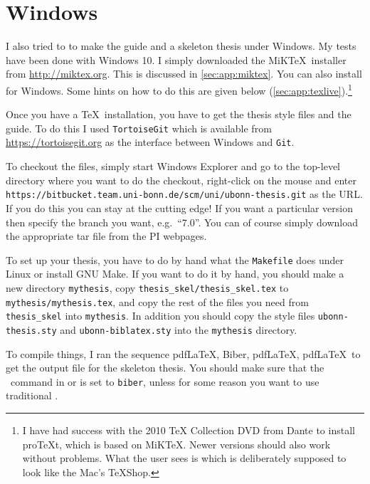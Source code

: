 \section{Windows}%
\label{sec:app:windows}

I also tried to to make the guide and a skeleton thesis under Windows. 
My tests have been done with Windows 10.
I simply downloaded the MiK\TeX\ installer from \url{http://miktex.org}.
This is discussed in \cref{sec:app:miktex}.
You can also install \TeXLive for Windows. Some hints on how to do
this are given below (\cref{sec:app:texlive}).\footnote{%
I have had success with the 2010 \TeX{} Collection DVD from Dante to install
pro\TeX t, which is based on MiK\TeX.
Newer versions should also work without problems.
What the user sees is \TeXworks
which is deliberately supposed to look like the Mac's \TeX Shop.}

Once you have a \TeX\ installation, you have to get the thesis style files and the guide.
To do this I used \texttt{TortoiseGit} which is available from
\url{https://tortoisegit.org} as the interface between Windows and
\texttt{Git}.

To checkout the files, simply start Windows Explorer and go to the
top-level directory where you want to do the checkout, right-click on
the mouse and enter\\
\texttt{https://bitbucket.team.uni-bonn.de/scm/uni/ubonn-thesis.git}
as the URL\@.
If you do this you can stay at the cutting edge!
If you want a particular version then specify the branch you want, e.g.\ \enquote{7.0}.
You can of course simply download the appropriate tar file from the PI webpages.

To set up your thesis, you have to do by hand what the
\texttt{Makefile} does under Linux or install GNU Make.
If you want to do it by hand, you should make a new directory
\texttt{mythesis}, copy \texttt{thesis\_skel/thesis\_skel.tex} to
\texttt{mythesis/mythesis.tex}, and copy the rest of the files you need from
\texttt{thesis\_skel} into \texttt{mythesis}. In addition you should
copy the style files \texttt{ubonn-thesis.sty} and \texttt{ubonn-biblatex.sty} into the
\texttt{mythesis} directory.

To compile things, I ran the sequence pdf\LaTeX, Biber, pdf\LaTeX,
pdf\LaTeX\ to get the output file for the skeleton thesis.
You should make sure that the \BibTeX\ command in \TeXstudio or \TeXworks
is set to \texttt{biber},
unless for some reason you want to use traditional \BibTeX.

